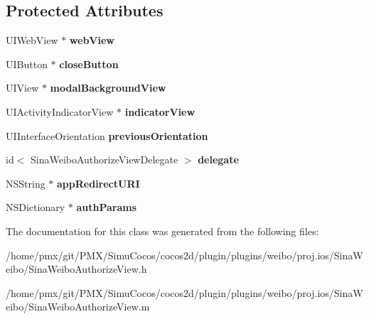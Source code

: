 \subsection*{Protected Attributes}
\begin{DoxyCompactItemize}
\item 
\mbox{\label{interfaceSinaWeiboAuthorizeView_a77a879e6fa3fa2042203ac131b9377c3}} 
U\+I\+Web\+View $\ast$ {\bfseries web\+View}
\item 
\mbox{\label{interfaceSinaWeiboAuthorizeView_a7c4226454d2f50839ab998c5531021af}} 
U\+I\+Button $\ast$ {\bfseries close\+Button}
\item 
\mbox{\label{interfaceSinaWeiboAuthorizeView_ae28f88f70920bcf48b7cf9d7b7418f6e}} 
U\+I\+View $\ast$ {\bfseries modal\+Background\+View}
\item 
\mbox{\label{interfaceSinaWeiboAuthorizeView_a01100c2d92a291f1059b88f6246c60df}} 
U\+I\+Activity\+Indicator\+View $\ast$ {\bfseries indicator\+View}
\item 
\mbox{\label{interfaceSinaWeiboAuthorizeView_adbecddc9847f2aa7f1d45ff8ea4fbaba}} 
U\+I\+Interface\+Orientation {\bfseries previous\+Orientation}
\item 
\mbox{\label{interfaceSinaWeiboAuthorizeView_a463ca09ff362b7d3ba63b98a84a6e07b}} 
id$<$ Sina\+Weibo\+Authorize\+View\+Delegate $>$ {\bfseries delegate}
\item 
\mbox{\label{interfaceSinaWeiboAuthorizeView_ad47c608b110c7db642a82971ca13a34d}} 
N\+S\+String $\ast$ {\bfseries app\+Redirect\+U\+RI}
\item 
\mbox{\label{interfaceSinaWeiboAuthorizeView_aeeae1599c072959672130dd8fd7aa492}} 
N\+S\+Dictionary $\ast$ {\bfseries auth\+Params}
\end{DoxyCompactItemize}


The documentation for this class was generated from the following files\+:\begin{DoxyCompactItemize}
\item 
/home/pmx/git/\+P\+M\+X/\+Simu\+Cocos/cocos2d/plugin/plugins/weibo/proj.\+ios/\+Sina\+Weibo/Sina\+Weibo\+Authorize\+View.\+h\item 
/home/pmx/git/\+P\+M\+X/\+Simu\+Cocos/cocos2d/plugin/plugins/weibo/proj.\+ios/\+Sina\+Weibo/Sina\+Weibo\+Authorize\+View.\+m\end{DoxyCompactItemize}
